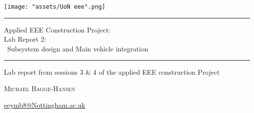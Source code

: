 \begin{titlepage} %

	\centering %
	
	\scshape %
	
	
	\texttt{[image: "assets/UoN eee".png]}
	
	 
	\rule{\textwidth}{2pt}\vspace*{-\baselineskip}\vspace*{2pt} %
	
	\vspace{0.75\baselineskip} %
	
	{\LARGE Applied EEE Construction Project:\\ Lab Report 2: \\ \ Subsystem design and Main vehicle integration\\} %
	
	\vspace{0.75\baselineskip} %
	
	\rule{\textwidth}{2pt} %
	
	\vspace{2\baselineskip} %
	
	
	Lab report from sessions 3 \& 4 of the applied EEE construction Project %
	
	\vspace*{3\baselineskip} %
	
	

	
	\vspace{0.5\baselineskip} %
	
	{\scshape\Large Michael Bagge-Hansen } %

	\href{mailto:eeymb8@Nottingham.ac.uk}{eeymb8@Nottingham.ac.uk}
	
	\vspace{1\baselineskip}
	

\end{titlepage}
